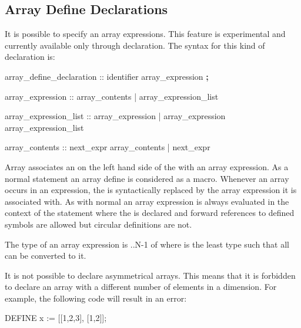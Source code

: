 \subsection{Array Define Declarations}
\label{Array Define Declarations}
%
It is possible to specify an array expressions. This
feature is experimental and currently available only through
 declaration.
%
The syntax for this kind of declaration is:
%
\begin{Grammar}
array_define_declaration :: 
                   identifier \operator{:=} array_expression \textbf{;}

array_expression :: \operator{[} array_contents \operator{]}
                   | \operator{[} array_expression_list \operator{]}

array_expression_list :: array_expression
                        | array_expression \operator{,} array_expression_list

array_contents :: next_expr \operator{,} array_contents
                 | next_expr
\end{Grammar}
%
Array  associates an  on the left hand
side of the  with an array expression.
%
As a normal  statement an array define is considered
as a macro.
%
Whenever an array  occurs in an expression, the
 is syntactically replaced by the array expression it is
associated with.
%
As with normal  an array  expression
is always evaluated in the context of the statement where the
 is declared and forward references to defined symbols are
allowed but circular definitions are not. 

The type of an array expression  is
..N-1 of  where  is the least type such that 
all  can be converted to it.


It is not possible to declare asymmetrical arrays. This means that
it is forbidden to declare an array with a different number of
elements in a dimension. For example, the following code will result
in an error:
%
\begin{nusmvCode}
DEFINE
   x := [[1,2,3], [1,2]];
\end{nusmvCode}


